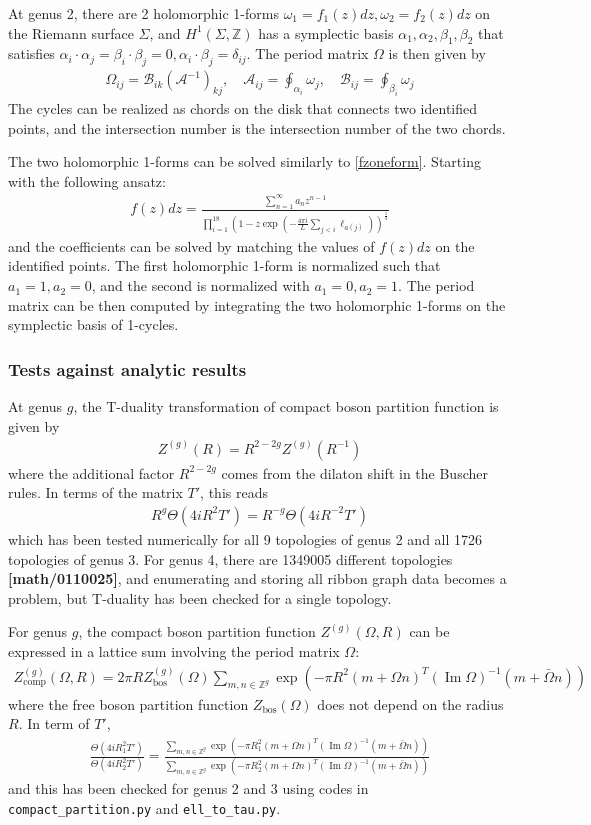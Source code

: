 \documentclass[12pt,letterpaper]{article}
\def\ie{\begin{equation}\begin{aligned}}
\def\fe{\end{aligned}\end{equation}}
\numberwithin{equation}{section}
\begin{document}
At genus 2, there are 2 holomorphic 1-forms $\omega_1=f_1(z)dz, \omega_2=f_2(z)dz$ on the Riemann surface $\Sigma$, and $H^1(\Sigma, \mathbb{Z})$ has a symplectic basis $\alpha_1, \alpha_2, \beta_1, \beta_2$ that satisfies $\alpha_i\cdot \alpha_j = \beta_i \cdot \beta_j=0, \alpha_i\cdot \beta_j =\delta_{ij}$. The period matrix $\Omega$ is then given by
\ie
\Omega_{ij}=\mathcal{B}_{ik}(\mathcal{A}^{-1})_{kj},\quad \mathcal{A}_{ij}=\oint_{\alpha_i}\omega_j,\quad \mathcal{B}_{ij}=\oint_{\beta_i} \omega_j
\fe
The cycles can be realized as chords on the disk that connects two identified points, and the intersection number is the intersection number of the two chords. 

The two holomorphic 1-forms can be solved similarly to \eqref{fzoneform}. Starting with the following ansatz:
\ie
f(z)dz= \frac{\sum_{n=1}^\infty a_n z^{n-1}}{\prod_{i=1}^{18}\left(1-z\exp\left({-\frac{4\pi i}{L}\sum_{j<i}\ell_{a(j)}}\right)\right)^{\frac{1}{3}}}
\fe
and the coefficients can be solved by matching the values of $f(z)dz$ on the identified points. The first holomorphic 1-form is normalized such that $a_1=1, a_2=0$, and the second is normalized with $a_1=0, a_2=1$. The period matrix can be then computed by integrating the two holomorphic 1-forms on the symplectic basis of 1-cycles.

\subsubsection*{Tests against analytic results}

At genus $g$, the T-duality transformation of compact boson partition function is given by
\ie
Z^{(g)}(R)=R^{2-2g}Z^{(g)}(R^{-1})
\fe
where the additional factor $R^{2-2g}$ comes from the dilaton shift in the Buscher rules. In terms of the matrix $T'$, this reads
\ie
R^g \Theta(4 i R^2 T')= R^{-g} \Theta(4 i R^{-2} T')
\fe
which has been tested numerically for all 9 topologies of genus 2 and all 1726 topologies of genus 3. For genus 4, there are 1349005 different topologies \textbf{[math/0110025]}, and enumerating and storing all ribbon graph data becomes a problem, but T-duality has been checked for a single topology.

For genus $g$, the compact boson partition function $Z^{(g)}(\Omega, R)$ can be expressed in a lattice sum involving the period matrix $\Omega$:
\ie
Z_\text{comp}^{(g)}(\Omega, R)=2\pi R Z_\text{bos}^{(g)}(\Omega)\sum_{m,n\in \mathbb{Z}^g}\exp\left(-\pi R^2(m+\Omega n)^T(\operatorname{Im}\Omega)^{-1}(m+\bar{\Omega}n)\right)
\fe
where the free boson partition function $Z_\text{bos}(\Omega)$ does not depend on the radius $R$. In term of $T'$,
\ie
\frac{\Theta(4 i R^2_1 T')}{\Theta(4 i R^2_2 T')}=\frac{\sum_{m,n\in \mathbb{Z}^g}\exp\left(-\pi R^2_1(m+\Omega n)^T(\operatorname{Im}\Omega)^{-1}(m+\bar{\Omega}n)\right)}{\sum_{m,n\in \mathbb{Z}^g}\exp\left(-\pi R^2_2(m+\Omega n)^T(\operatorname{Im}\Omega)^{-1}(m+\bar{\Omega}n)\right)}
\fe
and this has been checked for genus 2 and 3 using codes in \texttt{compact\_partition.py} and \texttt{ell\_to\_tau.py}.
\end{document}
